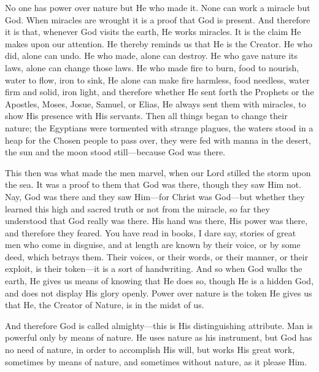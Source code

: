 No one has power over nature but He who made it.
None can work a miracle but God. When miracles are wrought it is a
proof that God is present. And therefore it is that, whenever God
visits the earth, He works miracles. It is the claim He makes upon our
attention. He thereby reminds us that He is the Creator. He who did,
alone can undo. He who made, alone can destroy. He who gave nature its
laws, alone can change those laws. He who made fire to burn, food to
nourish, water to flow, iron to sink, He alone can make fire harmless,
food needless, water firm and solid, iron light, and therefore whether
He sent forth the Prophets or the Apostles, Moses, Josue, Samuel, or
Elias, He always sent them with miracles, to show His presence with
His servants. Then all things began to change their nature; the
Egyptians were tormented with strange plagues, the waters stood
in a heap for the Chosen people to pass over, they were fed with manna
in the desert, the sun and the moon stood still—because God was
there.

This then was what made the men marvel, when our
Lord stilled the storm upon the sea. It was a proof to them that God
was there, though they saw Him not. Nay, God was there and they saw
Him—for Christ was God—but whether they learned this high and
sacred truth or not from the miracle, so far they understood that God
really was there. His hand was there, His power was there, and
therefore they feared. You have read in books, I dare say, stories of
great men who come in disguise, and at length are known by their
voice, or by some deed, which betrays them. Their voices, or their
words, or their manner, or their exploit, is their token—it is a
sort of handwriting. And so when God walks the earth, He gives us
means of knowing that He does so, though He is a hidden God, and does
not display His glory openly. Power over nature is the token He gives
us that He, the Creator of Nature, is in the midst of us.

And therefore God is called almighty—this is
His distinguishing attribute. Man is powerful only by means of nature.
He uses nature as his instrument, but God has no need of nature, in
order to accomplish His will, but works His great work, sometimes by
means of nature, and sometimes without nature, as it please Him.

